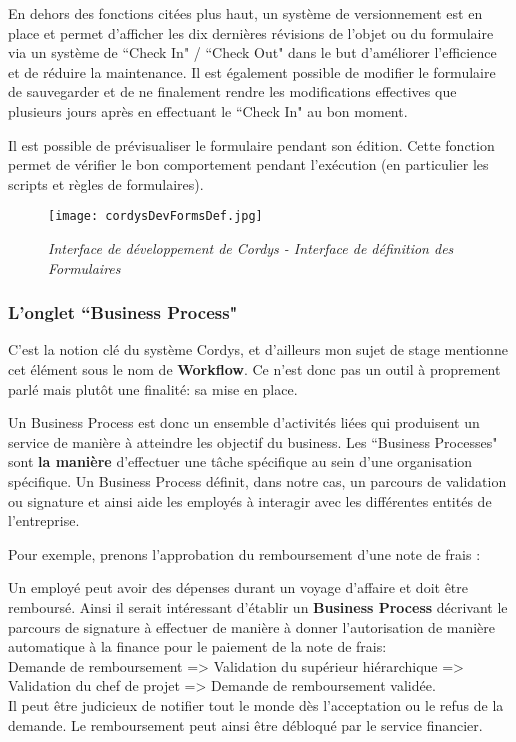 En dehors des fonctions citées plus haut, un système de versionnement est en place et permet d'afficher les dix dernières révisions de l'objet ou du formulaire via un système de ``Check In" / ``Check Out"  dans le but d'améliorer l'efficience et de réduire la maintenance. Il est également possible de modifier le formulaire de sauvegarder et de ne finalement rendre les modifications effectives que plusieurs jours après en effectuant le ``Check In" au bon moment.

Il est possible de prévisualiser le formulaire pendant son édition. Cette fonction permet de vérifier le bon comportement pendant l'exécution (en particulier les scripts et règles de formulaires).
\vspace{8mm}

\begin{figure}[H]
    \centering
    \texttt{[image: cordysDevFormsDef.jpg]}
	\caption{\textit{Interface de développement de Cordys - Interface de définition des Formulaires}}\label{image.cordysDevFormsDef} 
\end{figure}

\clearpage
\subsubsection{L'onglet ``Business Process"}

C'est la notion clé du système Cordys, et d'ailleurs mon sujet de stage mentionne cet élément sous le nom de \textbf{Workflow}. Ce n'est donc pas un outil à proprement parlé mais plutôt une finalité: sa mise en place.

Un Business Process est donc un ensemble d'activités liées qui produisent un service de manière à atteindre les objectif du business. Les ``Business Processes" sont \textbf{la manière} d'effectuer une tâche spécifique au sein d'une organisation spécifique. 
Un Business Process définit, dans notre cas, un parcours de validation ou signature et ainsi aide les employés à interagir avec les différentes entités de l'entreprise.



Pour exemple, prenons l'approbation du remboursement d'une note de frais :

Un employé peut avoir des dépenses durant un voyage d'affaire et doit être remboursé. Ainsi il serait intéressant d'établir un \textbf{Business Process} décrivant le parcours de signature à effectuer de manière à donner l'autorisation de manière automatique à la finance pour le paiement de la note de frais:\\
Demande de remboursement => Validation du supérieur hiérarchique => Validation du chef de projet => Demande de remboursement validée. \\
Il peut être judicieux de notifier tout le monde dès l'acceptation ou le refus de la demande. Le remboursement peut ainsi être débloqué par le service financier.

